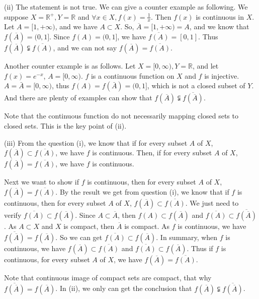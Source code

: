 \documentclass[12pt,a4paper]{ctexart}
\begin{document}
(ii) The statement is not true. We can give a counter example as following. We suppose $X = \mathbb{R}^{+}, Y = \mathbb{R}$ and $\forall x \in X, f(x) = \frac{1}{x}$. Then $f(x)$ is continuous in $X$. Let $A = [1, + \infty)$, and we have $A \subset X$. So, $\overline{A} = [1, + \infty) = A$, and we know that $f(\overline{A}) = (0, 1]$. Since $f(A) = (0, 1]$, we have $\overline{f(A)} = [0, 1]$. Thus $f(\overline{A}) \subsetneqq \overline{f(A)}$, and we can not say $f(\overline{A}) = \overline{f(A)}$.

Another counter example is as follows. Let $X = [0, \infty), Y = \mathbb R$, and let $f(x) = e^{-x}$, $A = [0, \infty)$. $f$ is a continuous function on $X$ and $f$ is injective. $A = \bar A = [0, \infty)$, thus $f(A) = f(\bar A) = (0, 1]$, which is not a closed subset of $Y$. And there are plenty of examples can show that $f(\overline{A}) \subsetneqq \overline{f(\overline{A})}$.

Note that the continuous function do not necessarily mapping closed sets to closed sets. This is the key point of (ii).

(iii) From the question (i), we know that if for every subset $A$ of $X$, $f(\overline{A}) \subset  \overline{f(A)}$, we have $f$ is continuous. Then, if for every subset $A$ of $X$, $f(\overline{A}) = \overline{f(A)}$, we have $f$ is continuous. 

Next we want to show if $f$ is continuous, then for every subset $A$ of $X$, $f(\overline{A}) = \overline{f(A)}$. By the result we get from question (i), we know that if $f$ is continuous, then for every subset $A$ of $X$, $f(\overline{A}) \subset  \overline{f(A)}$. We just need to verify $\overline{f(A)} \subset  f(\overline{A})$. Since $A \subset \overline{A}$, then $f(A) \subset f(\overline{A})$ and $\overline{f(A)} \subset \overline{f(\overline{A})}$. As $A \subset X$ and $X$ is compact, then $\overline{A}$ is compact. As $f$ is continuous, we have $\overline{f(\overline{A})} = f(\overline{A})$. So we can get $\overline{f(A)} \subset  f(\overline{A})$. In summary, when $f$ is continuous, we have $f(\overline{A}) \subset  \overline{f(A)}$ and $\overline{f(A)} \subset  f(\overline{A})$. Thus if $f$ is continuous, for every subset $A$ of $X$, we have $f(\overline{A}) = \overline{f(A)}$.

Note that continuous image of compact sets are compact, that why $\overline{f(\overline{A})} = f(\overline{A})$. In (ii), we only can get the conclusion that $f(\overline{A}) \subsetneqq \overline{f(\overline{A})}$.
\end{document}
